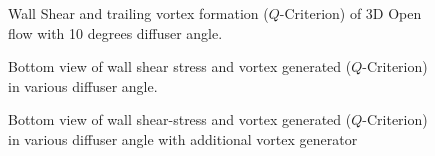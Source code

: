 \begin{figure}[!htb]
    \centering
    \noindent{}
    \caption{Wall Shear and trailing vortex formation ($Q$-Criterion) of 3D Open flow with 10 degrees diffuser angle.}
    \label{fig:3D_OF_ISO_COMPARE}
\end{figure}
\begin{figure}
    \centering
    \noindent{}
    \caption{Bottom view of wall shear stress and vortex generated ($Q$-Criterion) in various diffuser angle.}
    \label{fig:3D_OF_BOTTOM_VIEW_COMPARE_DIFF}
\end{figure}

\begin{figure}
    \centering
    \noindent{}
    \caption{Bottom view of wall shear-stress and vortex generated ($Q$-Criterion) in various diffuser angle with additional vortex generator}
    \label{fig:3D_OF_BOTTOM_VIEW_COMPARE_DIFF_F}
\end{figure}

